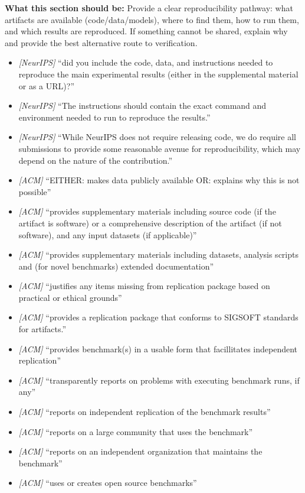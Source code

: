 \noindent\textbf{What this section should be:}
Provide a clear reproducibility pathway: what artifacts are available (code/data/models), where to find them, how to run them, and which results are reproduced. If something cannot be shared, explain why and provide the best alternative route to verification.
\begin{itemize}
  \item \textit{[NeurIPS]} ``did you include the code, data, and instructions needed to reproduce the main experimental results (either in the supplemental material or as a URL)?''
  \item \textit{[NeurIPS]} ``The instructions should contain the exact command and environment needed to run to reproduce the results.''
  \item \textit{[NeurIPS]} ``While NeurIPS does not require releasing code, we do require all submissions to provide some reasonable avenue for reproducibility, which may depend on the nature of the contribution.''
  \item \textit{[ACM]} ``EITHER: makes data publicly available OR: explains why this is not possible''
  \item \textit{[ACM]} ``provides supplementary materials including source code (if the artifact is software) or a comprehensive description of the artifact (if not software), and any input datasets (if applicable)''
  \item \textit{[ACM]} ``provides supplementary materials including datasets, analysis scripts and (for novel benchmarks) extended documentation''
  \item \textit{[ACM]} ``justifies any items missing from replication package based on practical or ethical grounds''
  \item \textit{[ACM]} ``provides a replication package that conforms to SIGSOFT standards for artifacts.''
  \item \textit{[ACM]} ``provides benchmark(s) in a usable form that facillitates independent replication''
  \item \textit{[ACM]} ``transparently reports on problems with executing benchmark runs, if any''
  \item \textit{[ACM]} ``reports on independent replication of the benchmark results''
  \item \textit{[ACM]} ``reports on a large community that uses the benchmark''
  \item \textit{[ACM]} ``reports on an independent organization that maintains the benchmark''
  \item \textit{[ACM]} ``uses or creates open source benchmarks''
\end{itemize}